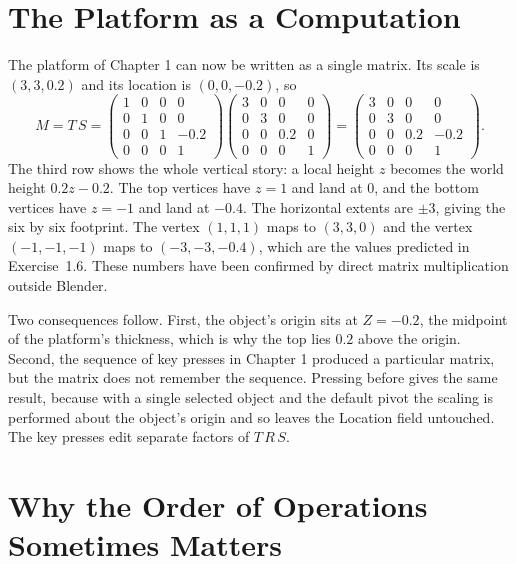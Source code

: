 \section{The Platform as a Computation}

The platform of Chapter 1 can now be written as a single matrix. Its scale is $(3,3,0.2)$ and its location is $(0,0,-0.2)$, so
\[
  M=T\,S=
  \begin{pmatrix}
    1&0&0&0\\ 0&1&0&0\\ 0&0&1&-0.2\\ 0&0&0&1
  \end{pmatrix}
  \begin{pmatrix}
    3&0&0&0\\ 0&3&0&0\\ 0&0&0.2&0\\ 0&0&0&1
  \end{pmatrix}
  =
  \begin{pmatrix}
    3&0&0&0\\ 0&3&0&0\\ 0&0&0.2&-0.2\\ 0&0&0&1
  \end{pmatrix}.
\]
The third row shows the whole vertical story: a local height $z$ becomes the world height $0.2z-0.2$. The top vertices have $z=1$ and land at $0$, and the bottom vertices have $z=-1$ and land at $-0.4$. The horizontal extents are $\pm3$, giving the six by six footprint. The vertex $(1,1,1)$ maps to $(3,3,0)$ and the vertex $(-1,-1,-1)$ maps to $(-3,-3,-0.4)$, which are the values predicted in Exercise~1.6. These numbers have been confirmed by direct matrix multiplication outside Blender.

Two consequences follow. First, the object's origin sits at $Z=-0.2$, the midpoint of the platform's thickness, which is why the top lies $0.2$ above the origin. Second, the sequence of key presses in Chapter 1 produced a particular matrix, but the matrix does not remember the sequence. Pressing  before  gives the same result, because with a single selected object and the default pivot the scaling is performed about the object's origin and so leaves the Location field untouched. The key presses edit separate factors of $T\,R\,S$.

\section{Why the Order of Operations Sometimes Matters}

